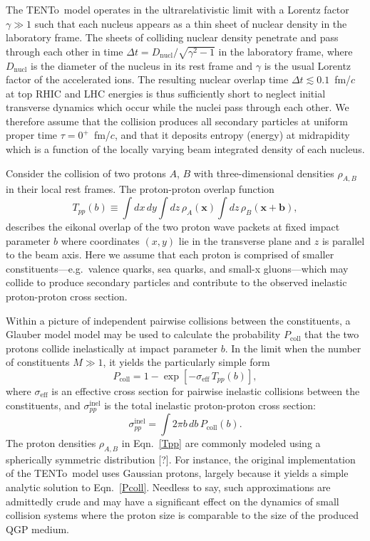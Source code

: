 \documentclass[aps,prc,reprint,amsmath,nofootinbib]{revtex4-1}
\newcommand{\trento}{T\raisebox{-0.5ex}{R}ENTo}
\newcommand{\x}{\mathbf{x}}
\newcommand{\note}{\textcolor{theblue}{[?]}}
\def\\#1{ #1}
\begin{document}
The \trento\ model operates in the ultrarelativistic limit with a Lorentz factor $\gamma \gg 1$ such that each nucleus appears as a thin sheet of nuclear density in the laboratory frame.
The sheets of colliding nuclear density penetrate and pass through each other in time $\Delta t = D_\text{nucl} / \sqrt{\gamma^2 - 1}$ in the laboratory frame, where $D_\text{nucl}$ is the diameter of the nucleus in its rest frame and $\gamma$ is the usual Lorentz factor of the accelerated ions.
The resulting nuclear overlap time $\Delta t \lesssim 0.1$~fm/$c$ at top RHIC and LHC energies is thus sufficiently short to neglect initial transverse dynamics which occur while the nuclei pass through each other.
We therefore assume that the collision produces all secondary particles at uniform proper time $\tau = 0^+$~fm/$c$, and that it deposits entropy (energy) at midrapidity which is a function of the locally varying beam integrated density of each nucleus.

Consider the collision of two protons $A$, $B$ with three-dimensional densities $\rho_{A,B}$ in their local rest frames.
The proton-proton overlap function
\begin{equation}
  \label{Tpp}
  T_{pp}(b) \equiv \int dx\, dy \int dz\, \rho_A(\x) \int dz\, \rho_B(\x + \mathbf{b}),
\end{equation}
describes the eikonal overlap of the two proton wave packets at fixed impact parameter $b$ where coordinates $(x, y)$ lie in the transverse plane and $z$ is parallel to the beam axis.
Here we assume that each proton is comprised of smaller constituents---e.g.\ valence quarks, sea quarks, and small-x gluons---which may collide to produce secondary particles and contribute to the observed inelastic proton-proton cross section.

Within a picture of independent pairwise collisions between the constituents, a Glauber model model may be used to calculate the probability $P_\mathrm{coll}$ that the two protons collide inelastically at impact parameter $b$. In the limit when the number of constituents $M \gg 1$, it yields the particularly simple form
\begin{equation}
  \label{Pcoll}
  P_\mathrm{coll} = 1 - \exp[-\sigma_\mathrm{eff}\, T_{pp}(b)], \\
\end{equation}
where $\sigma_\mathrm{eff}$ is an effective cross section for pairwise inelastic collisions between the constituents, and $\sigma_{pp}^\mathrm{inel}$ is the total inelastic proton-proton cross section:
\begin{equation}
  \label{sigma_nn}
  \sigma_{pp}^\mathrm{inel} = \int 2 \pi b\, db\, P_\mathrm{coll}(b).
\end{equation}
The proton densities $\rho_{A,B}$ in Eqn.~\eqref{Tpp} are commonly modeled using a spherically symmetric distribution \note.
For instance, the original implementation of the \trento\ model uses Gaussian protons, largely because it yields a simple analytic solution to Eqn.~\eqref{Pcoll}.
Needless to say, such approximations are admittedly crude and may have a significant effect on the dynamics of small collision systems where the proton size is comparable to the size of the produced QGP medium.
\end{document}
